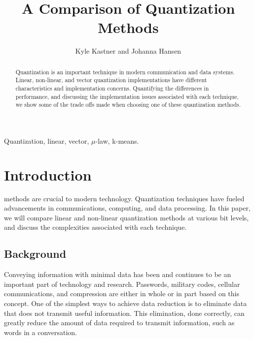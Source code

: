\documentclass[journal]{IEEEtran}
\begin{document}
\title{A Comparison of Quantization Methods}

\author{Kyle Kastner and Johanna Hansen}%

\maketitle

\begin{abstract}
Quantization is an important technique in modern communication and data systems. Linear, non-linear, and vector quantization
implementations have different characteristics and implementation concerns. Quantifying the differences in performance, and discussing 
the implementation issues associated with each technique, we show some of the trade offs made when choosing one of these quantization methods.
\end{abstract}

\begin{IEEEkeywords}
Quantization, linear, vector, $\mu$-law, k-means.
\end{IEEEkeywords}

\IEEEpeerreviewmaketitle
\section{Introduction}
 methods are crucial to modern technology. Quantization techniques have fueled 
advancements in communications, computing, and data processing. In this paper, we will compare linear and non-linear 
quantization methods at various bit levels, and discuss the complexities associated with each technique.

\subsection{Background}
Conveying information with minimal data has been and continues to be an important part of technology and research. Passwords, 
military codes, cellular communications, and compression are either in whole or in part based on this concept. One of the simplest ways
to achieve data reduction is to eliminate data that does not transmit useful information. This elimination, done correctly, can 
greatly reduce the amount of data required to transmit information, such as words in a conversation.
\end{document}
